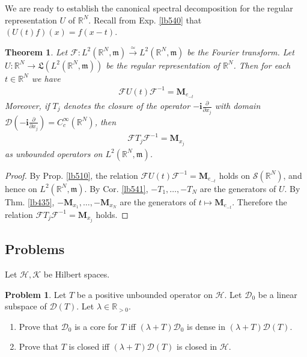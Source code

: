 \documentclass[12pt,b5paper,notitlepage]{article}
\theoremstyle{definition}
\newtheorem{prob}{\color{red}Problem}[section]
\theoremstyle{plain}
\newtheorem{thm}[df]{Theorem}
\newcommand{\fk}{\mathfrak}
\newcommand{\Dom}{\mathscr{D}}
\newcommand{\im}{\mathbf{i}}
\newcommand{\Rbb}{\mathbb R}
\newcommand{\mk}{\mathfrak m}
\newcommand{\MF}{\mathcal F}
\newcommand{\MH}{\mathcal H}
\newcommand{\MK}{\mathcal K}
\newcommand{\MS}{\mathcal S}
\newcommand{\Mbf}{\mathbf M}
\numberwithin{equation}{section}
\begin{document}
We are ready to establish the canonical spectral decomposition for the regular representation $U$ of $\Rbb^N$. Recall from Exp. \ref{lb540} that $(U(t)f)(x)=f(x-t)$.

\begin{thm}
Let $\MF:L^2(\Rbb^N,\mk)\xrightarrow{\simeq}L^2(\Rbb^N,\mk)$ be the Fourier transform. Let $U:\Rbb^N\rightarrow\fk L(L^2(\Rbb^N,\mk))$ be the regular representation of $\Rbb^N$. Then for each $t\in\Rbb^N$ we have
\begin{align*}
\MF U(t)\MF^{-1}=\Mbf_{e_{-t}}
\end{align*}
Moreover, if $T_j$ denotes the closure of the operator $-\im\frac{\partial}{\partial x_j}$ with domain $\Dom(-\im\frac{\partial}{\partial x_j})=C_c^\infty(\Rbb^N)$, then
\begin{align*}
\MF T_j\MF^{-1}=\Mbf_{x_j}
\end{align*}
as unbounded operators on $L^2(\Rbb^N,\mk)$.
\end{thm}

\begin{proof}
By Prop. \ref{lb510}, the relation $\MF U(t)\MF^{-1}=\Mbf_{e_{-t}}$ holds on $\MS(\Rbb^N)$, and hence on $L^2(\Rbb^N,\mk)$. By Cor. \ref{lb541}, $-T_1,\dots,-T_N$ are the generators of $U$. By Thm. \ref{lb435}, $-\Mbf_{x_1},\dots,-\Mbf_{x_N}$ are the generators of $t\mapsto\Mbf_{e_{-t}}$. Therefore the relation $\MF T_j\MF^{-1}=\Mbf_{x_j}$ holds.
\end{proof}




\hypertarget{current}{}

\subsection{Problems}


Let $\MH,\MK$ be Hilbert spaces.


\begin{prob}\label{lb482}
Let $T$ be a positive unbounded operator on $\MH$. Let $\Dom_0$ be a linear subspace of $\Dom(T)$. Let $\lambda\in\Rbb_{>0}$.
\begin{enumerate}
\item Prove that $\Dom_0$ is a core for $T$ iff $(\lambda+T)\Dom_0$ is dense in $(\lambda+T)\Dom(T)$.
\item Prove that $T$ is closed iff $(\lambda+T)\Dom(T)$ is closed in $\MH$.
\end{enumerate} 
\end{prob}
\end{document}
